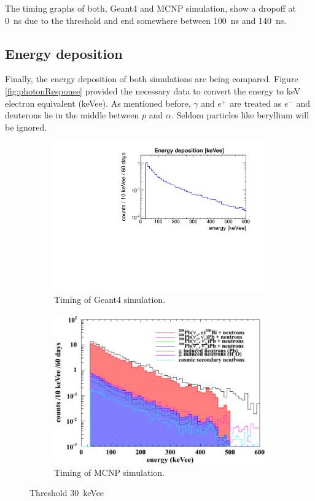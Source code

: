 \documentclass[12pt]{article}
\begin{document}
The timing graphs of both, Geant4 and MCNP simulation, show a dropoff at \SI{0}{ns} due to the threshold and end somewhere between \SI{100}{ns} and \SI{140}{ns}.  

\subsection{Energy deposition}

Finally, the energy deposition of both simulations are being compared. Figure \ref{fig:photonResponse} provided the necessary data to convert the energy to keV electron equivalent (keVee). As mentioned before, $\gamma$ and $e^+$ are treated as $e^-$ and deuterons lie in the middle between $p$ and $\alpha$. Seldom particles like beryllium will be ignored.

 \begin{figure}[H]
 	\begin{subfigure}[t]{0.49\textwidth}
 		\includegraphics[trim = 0cm 0cm 0cm 1.15cm, clip, width=\textwidth]{pics/edep.pdf}
 		\caption{Timing of Geant4 simulation.}
 	\end{subfigure}
 	\begin{subfigure}[t]{0.49\textwidth}
 		\includegraphics[trim = 0cm 0cm 0cm 1.15cm, clip,width=\textwidth]{pics/edep_MCNP.pdf}
 		\caption{Timing of MCNP simulation.}
 	\end{subfigure}
 	\caption{Threshold \SI{30}{keVee}}
 	\label{fig:edep30}
 \end{figure}
 
\end{document}
